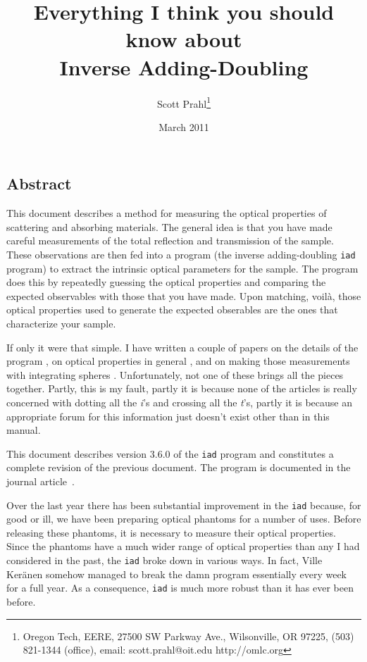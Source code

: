 \documentclass{article}
\newcommand\iadprog{\texttt{iad}}
\begin{document}
\title{Everything I think you should know about \\
Inverse Adding-Doubling}
\author{
	Scott Prahl\thanks{Oregon Tech,
	            EERE,
	            27500 SW Parkway Ave.,
	            Wilsonville, OR 97225,
	            (503) 821-1344 (office),
	            email: scott.prahl@oit.edu
	            http://omlc.org}	
}
\date{March 2011}	

\maketitle

\subsection*{Abstract}  
This document describes a method for measuring the optical properties of
scattering and absorbing materials.  The general idea is that you have made 
careful measurements of the total
reflection and transmission of the sample.  These observations are then fed into
a program (the inverse adding-doubling \iadprog{} program) to extract the intrinsic
optical parameters for the sample.   The program does this by repeatedly guessing
the optical properties and comparing the expected observables with those that you
have made.  Upon matching, voil\`a, those optical properties used to generate the
expected obserables are the ones that characterize your sample.

If only it were that simple.  I have written a couple of papers on the details of
the program \cite{jacques87a,prahl93a,moffitt06a}, on optical properties in general
\cite{cheong90a}, and on making those measurements with integrating spheres
\cite{pickering92,pickering93a}.  Unfortunately, not one of these brings all the
pieces together.  Partly, this is my fault, partly it is because none of the
articles is really concerned with dotting all the \textit{i}'s and crossing all
the \textit{t}'s, partly it is because an appropriate forum for this information
just doesn't exist other than in this manual.

This document describes version 3.6.0 of the \iadprog{} program and constitutes
a complete revision of the previous document.  The program is documented in the
journal article~\cite{moffitt07a}.

Over the last year there has been substantial improvement in the \iadprog{} because,
for good or ill, we have been preparing optical phantoms for a number of uses.
Before releasing these phantoms, it is necessary to measure their optical properties.
Since the phantoms have a much wider range of optical properties than any I had
considered in the past, the \iadprog{} broke down in various ways.  In fact, Ville
Ker{\"a}nen somehow managed to break the damn program essentially every week for a
full year.  As a consequence, \iadprog{} is much more robust than it has ever been before.
\end{document}
